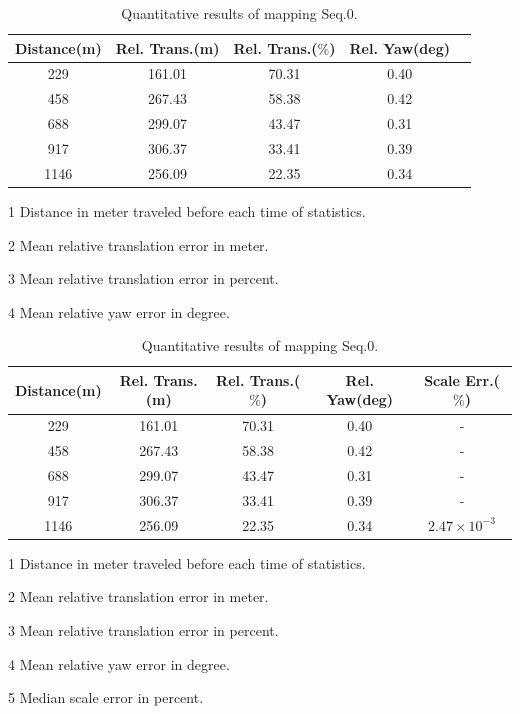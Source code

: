 \begin{table}
	\centering
	\caption{Quantitative results of mapping Seq.0.}
	\begin{threeparttable}
		\begin{tabular}{|c|c|c|c|c|}
			\hline
			Distance(m)\tnote{1} & Rel. Trans.(m)\tnote{2}  & Rel. Trans.($\%$)\tnote{3} & Rel. Yaw(deg)\tnote{4}   \\
			\hline
			229& 161.01 & 70.31 & 0.40  \\
			\hline
			458&267.43& 58.38 & 0.42\\
			\hline
			688&299.07& 43.47 & 0.31 \\
			\hline
			917&306.37& 33.41 & 0.39 \\
			\hline
			1146&256.09& 22.35 & 0.34 \\
			\hline
		\end{tabular}
		\begin{tablenotes}
			\footnotesize
			\item[1] Distance in meter traveled before each time of statistics. 
			\item[2] Mean relative translation error in meter.
			\item[3] Mean relative translation error in percent.
			\item[4] Mean relative yaw error in degree.
		\end{tablenotes}
	
	\ifoutputscaleerror
			\begin{tabular}{|c|c|c|c|c|}
		\hline
		Distance(m)\tnote{1} & Rel. Trans.(m)\tnote{2}  & Rel. Trans.($\%$)\tnote{3} & Rel. Yaw(deg)\tnote{4} & Scale Err.($\%$)\tnote{5}  \\
		\hline
		229& 161.01 & 70.31 & 0.40 & - \\
		\hline
		458&267.43& 58.38 & 0.42& - \\
		\hline
		688&299.07& 43.47 & 0.31 & - \\
		\hline
		917&306.37& 33.41 & 0.39& - \\
		\hline
		1146&256.09& 22.35 & 0.34 & $2.47\times10^{-3}$\\
		\hline
	\end{tabular}
	\begin{tablenotes}
		\footnotesize
		\item[1] Distance in meter traveled before each time of statistics. 
		\item[2] Mean relative translation error in meter.
		\item[3] Mean relative translation error in percent.
		\item[4] Mean relative yaw error in degree.
		\item[5] Median scale error in percent.
	\end{tablenotes}
\fi
	\end{threeparttable}
	\label{tbl:kittiseq0quanresult}
\end{table}

